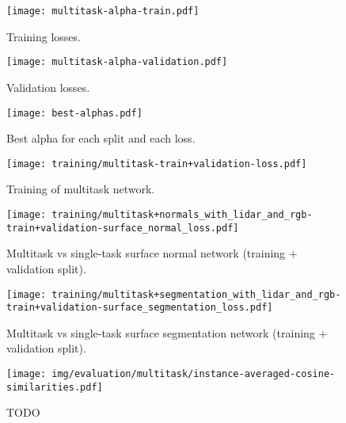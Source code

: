 \begin{figure}[H]
  \texttt{[image: multitask-alpha-train.pdf]}
  \caption{Training losses.}
\end{figure}

\begin{figure}[H]
  \texttt{[image: multitask-alpha-validation.pdf]}
  \caption{Validation losses.}
\end{figure}

\begin{figure}[H]
  \texttt{[image: best-alphas.pdf]}
  \caption{Best alpha for each split and each loss.}
\end{figure}

\begin{figure}[H]
  \texttt{[image: training/multitask-train+validation-loss.pdf]}
  \caption{Training of multitask network.}
\end{figure}

\begin{figure}[H]
  \texttt{[image: training/multitask+normals\_with\_lidar\_and\_rgb-train+validation-surface\_normal\_loss.pdf]}
  \caption{Multitask vs single-task surface normal network (training + validation split).}
\end{figure}

\begin{figure}[H]
  \texttt{[image: training/multitask+segmentation\_with\_lidar\_and\_rgb-train+validation-surface\_segmentation\_loss.pdf]}
  \caption{Multitask vs single-task surface segmentation network (training + validation split).}
\end{figure}

\begin{figure}[H]
  \texttt{[image: img/evaluation/multitask/instance-averaged-cosine-similarities.pdf]}
  \caption{TODO}
\end{figure}
